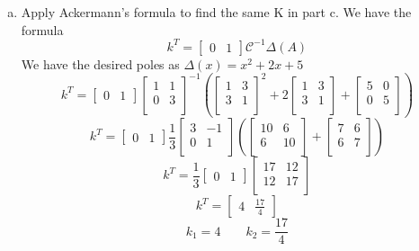 \documentclass{article}
\begin{document}
\begin{enumerate}[a.]
\item Apply Ackermann's formula to find the same K in part c.
\newline
We have the formula
$$ k^T = \begin{bmatrix}0 & 1 \end{bmatrix} \mathcal{C}^{-1} \Delta (A) $$
We have the desired poles as $ \Delta (x) = x^2 + 2x + 5 $
$$ k^T =
\begin{bmatrix} 0 & 1 \end{bmatrix}
\begin{bmatrix}
1 & 1 \\
0 & 3 \\
\end{bmatrix}
^{-1}
(
\begin{bmatrix}
1 & 3 \\
3 & 1 \\
\end{bmatrix}
^2
+
2
\begin{bmatrix}
1 & 3 \\
3 & 1 \\
\end{bmatrix}
+
\begin{bmatrix}
5 & 0 \\
0 & 5 \\
\end{bmatrix}
)
$$
$$ k^T =
\begin{bmatrix} 0 & 1 \end{bmatrix}
\frac{1}{3}
\begin{bmatrix}
3 & -1 \\
0 &  1 \\
\end{bmatrix}
(
\begin{bmatrix}
10 &  6 \\
 6 & 10 \\
\end{bmatrix}
+
\begin{bmatrix}
7 & 6 \\
6 & 7 \\
\end{bmatrix}
)
$$
$$ k^T =
\frac{1}{3}
\begin{bmatrix} 0 & 1 \end{bmatrix}
\begin{bmatrix}
17 & 12 \\
12 & 17 \\
\end{bmatrix}
$$
$$ k^T = \begin{bmatrix} 4 & \frac{17}{4} \end{bmatrix} $$
$$ k_1 = 4 \qquad k_2 = \frac{17}{4} $$


\end{enumerate}
\end{document}
